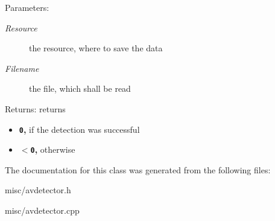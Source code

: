 \begin{Desc}
\item[Parameters:]
\begin{description}
\item[{\em Resource}]the resource, where to save the data \item[{\em Filename}]the file, which shall be read \end{description}
\end{Desc}
\begin{Desc}
\item[Returns:]returns\begin{itemize}
\item {\bf {\tt 0},} if the detection was successful\item {\bf {\tt $<$0},} otherwise \end{itemize}
\end{Desc}


The documentation for this class was generated from the following files:\begin{CompactItemize}
\item 
misc/avdetector.h\item 
misc/avdetector.cpp\end{CompactItemize}
